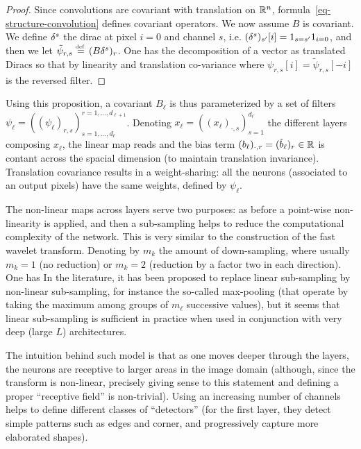 \begin{proof}
	Since convolutions are covariant with translation on $\mathbb{R}^n$, formula~\eqref{eq-structure-convolution} defines covariant operators.
	We now assume $B$ is covariant. We define $\delta^{s}$ the dirac at pixel $i=0$ and channel $s$, i.e. $(\delta^{s})_{s'}[i] = 1_{s=s'} 1_{i=0}$, and then we let $\tilde\psi_{r,s} \stackrel{\mbox{\upshape\tiny def.}}{=} (B \delta^s)_r$. One has the decomposition of a vector as translated Diracs
	so that by linearity and translation co-variance
	where $\psi_{r,s}[i] = \tilde \psi_{r,s}[-i]$ is the reversed filter. 
\end{proof}

Using this proposition, a covariant $B_\ell$  is thus parameterized by a set of filters $\psi_\ell = ( (\psi_\ell)_{r,s} )_{s=1,\ldots,d_{\ell}}^{r=1,\ldots,d_{\ell+1}}$. Denoting $x_\ell = ( (x_{\ell})_{\cdot,s} )_{s=1}^{d_\ell}$ the different layers composing $x_\ell$, the linear map reads
and the bias term $(b_\ell)_{\cdot,r} = (\tilde b_\ell)_r \in \mathbb{R}$ is contant across the spacial dimension (to maintain translation invariance).
%
Translation covariance results in a weight-sharing: all the neurons (associated to an output pixels) have the same weights, defined by $\psi_\ell$. 

The non-linear maps across layers serve two purposes: as before a point-wise non-linearity is applied, and then a sub-sampling helps to reduce the computational complexity of the network. This is very similar to the construction of the fast wavelet transform. Denoting by $m_k$ the amount of down-sampling, where usually $m_k=1$ (no reduction) or $m_k=2$ (reduction by a factor two in each direction). One has
In the literature, it has been proposed to replace linear sub-sampling by non-linear sub-sampling, for instance the so-called max-pooling (that operate by taking the maximum among groups of $m_\ell$ successive values), but it seems that linear sub-sampling is sufficient in practice when used in conjunction with very deep (large $L$) architectures. 

The intuition behind such model is that as one moves deeper through the layers, the neurons are receptive to larger areas in the image domain (although, since the transform is non-linear, precisely giving sense to this statement and defining a proper ``receptive field'' is non-trivial). Using an increasing number of channels helps to define different classes of ``detectors'' (for the first layer, they detect simple patterns such as edges and corner, and progressively capture more elaborated shapes).

